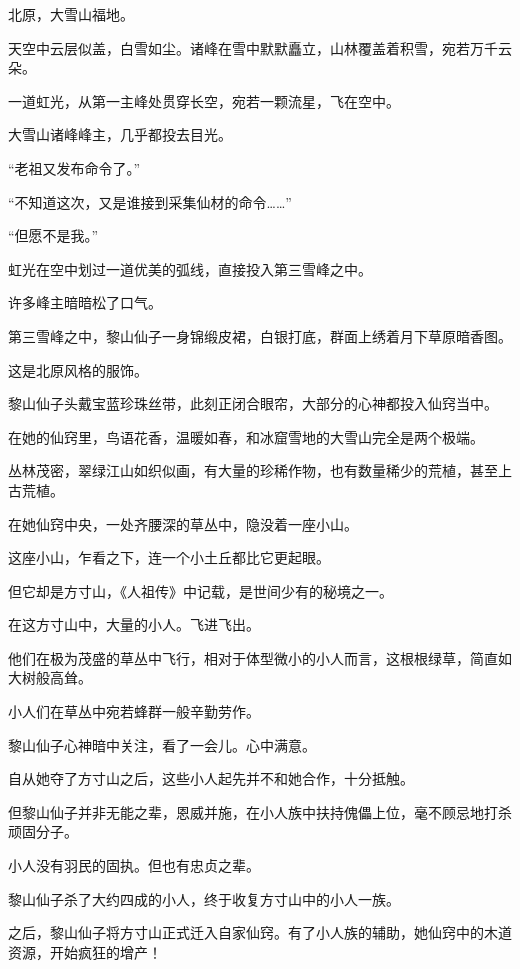 
\begin{this_body}

北原，大雪山福地。

天空中云层似盖，白雪如尘。诸峰在雪中默默矗立，山林覆盖着积雪，宛若万千云朵。

一道虹光，从第一主峰处贯穿长空，宛若一颗流星，飞在空中。

大雪山诸峰峰主，几乎都投去目光。

“老祖又发布命令了。”

“不知道这次，又是谁接到采集仙材的命令……”

“但愿不是我。”

虹光在空中划过一道优美的弧线，直接投入第三雪峰之中。

许多峰主暗暗松了口气。

第三雪峰之中，黎山仙子一身锦缎皮裙，白银打底，群面上绣着月下草原暗香图。

这是北原风格的服饰。

黎山仙子头戴宝蓝珍珠丝带，此刻正闭合眼帘，大部分的心神都投入仙窍当中。

在她的仙窍里，鸟语花香，温暖如春，和冰窟雪地的大雪山完全是两个极端。

丛林茂密，翠绿江山如织似画，有大量的珍稀作物，也有数量稀少的荒植，甚至上古荒植。

在她仙窍中央，一处齐腰深的草丛中，隐没着一座小山。

这座小山，乍看之下，连一个小土丘都比它更起眼。

但它却是方寸山，《人祖传》中记载，是世间少有的秘境之一。

在这方寸山中，大量的小人。飞进飞出。

他们在极为茂盛的草丛中飞行，相对于体型微小的小人而言，这根根绿草，简直如大树般高耸。

小人们在草丛中宛若蜂群一般辛勤劳作。

黎山仙子心神暗中关注，看了一会儿。心中满意。

自从她夺了方寸山之后，这些小人起先并不和她合作，十分抵触。

但黎山仙子并非无能之辈，恩威并施，在小人族中扶持傀儡上位，毫不顾忌地打杀顽固分子。

小人没有羽民的固执。但也有忠贞之辈。

黎山仙子杀了大约四成的小人，终于收复方寸山中的小人一族。

之后，黎山仙子将方寸山正式迁入自家仙窍。有了小人族的辅助，她仙窍中的木道资源，开始疯狂的增产！


\end{this_body}
